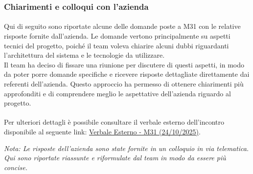 \documentclass[a4paper,11pt]{article}
\begin{document}
\subsubsection{Chiarimenti e colloqui con l'azienda}
\paragraph{}
Qui di seguito sono riportate alcune delle domande poste a M31 con le relative risposte fornite dall'azienda. Le domande vertono principalmente su aspetti tecnici del progetto, poiché il team voleva chiarire alcuni dubbi riguardanti l'architettura del sistema e le tecnologie da utilizzare. \\
Il team ha deciso di fissare una riunione per discutere di questi aspetti, in modo da poter porre domande specifiche e ricevere risposte dettagliate direttamente dai referenti dell'azienda. Questo approccio ha permesso di ottenere chiarimenti più approfonditi e di comprendere meglio le aspettative dell'azienda riguardo al progetto.\\\\
Per ulteriori dettagli è possibile consultare il verbale esterno dell'incontro disponibile al seguente link: \href{https://bugbustersunipd.github.io/BugBusterSite/assets/docs/VERBALI_Esterni/VE_24_10_2025_M31/VE_24_10_2025_M31_.pdf}{Verbale Esterno - M31 (24/10/2025)}.

\begin{center}
\small\textit{Nota: Le risposte dell'azienda sono state fornite in un colloquio in via telematica. Qui sono riportate riassunte e riformulate dal team in modo da essere più concise.}
\end{center}
\end{document}
